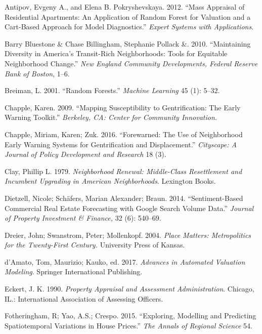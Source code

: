 \documentclass[]{article}
\begin{document}
\hypertarget{ref-antipov12}{}
Antipov, Evgeny A., and Elena B. Pokryshevskaya. 2012. ``Mass Appraisal
of Residential Apartments: An Application of Random Forest for Valuation
and a Cart-Based Approach for Model Diagnostics.'' \emph{Expert Systems
with Applications}.

\hypertarget{ref-Pollack2010}{}
Barry Bluestone \& Chase Billingham, Stephanie Pollack \&. 2010.
``Maintaining Diversity in America's Transit-Rich Neighborhoods: Tools
for Equitable Neighborhood Change.'' \emph{New England Community
Developments, Federal Reserve Bank of Boston}, 1--6.

\hypertarget{ref-Breiman2001}{}
Breiman, L. 2001. ``Random Forests.'' \emph{Machine Learning} 45 (1):
5--32.

\hypertarget{ref-Chapple2009}{}
Chapple, Karen. 2009. ``Mapping Susceptibility to Gentrification: The
Early Warning Toolkit.'' \emph{Berkeley, CA: Center for Community
Innovation.}

\hypertarget{ref-Chapple2016}{}
Chapple, Miriam, Karen; Zuk. 2016. ``Forewarned: The Use of Neighborhood
Early Warning Systems for Gentrification and Displacement.''
\emph{Cityscape: A Journal of Policy Development and Research} 18 (3).

\hypertarget{ref-Clay1979}{}
Clay, Phillip L. 1979. \emph{Neighborhood Renewal: Middle-Class
Resettlement and Incumbent Upgrading in American Neighborhoods}.
Lexington Books.

\hypertarget{ref-Dietzell2014}{}
Dietzell, Nicole; Schäfers, Marian Alexander; Braun. 2014.
``Sentiment-Based Commercial Real Estate Forecasting with Google Search
Volume Data.'' \emph{Journal of Property Investment \& Finance,} 32 (6):
540--69.

\hypertarget{ref-Dreier2004}{}
Dreier, John; Swanstrom, Peter; Mollenkopf. 2004. \emph{Place Matters:
Metropolitics for the Twenty-First Century.} University Press of Kansas.

\hypertarget{ref-Springer2017}{}
d'Amato, Tom, Maurizio; Kauko, ed. 2017. \emph{Advances in Automated
Valuation Modeling}. Springer International Publishing.

\hypertarget{ref-Eckert1990}{}
Eckert, J. K. 1990. \emph{Property Appraisal and Assessment
Administration}. Chicago, IL.: International Association of Assessing
Officers.

\hypertarget{ref-Fotheringham2015}{}
Fotheringham, R; Yao, A.S.; Crespo. 2015. ``Exploring, Modelling and
Predicting Spatiotemporal Variations in House Prices.'' \emph{The Annals
of Regional Science} 54.
\end{document}
